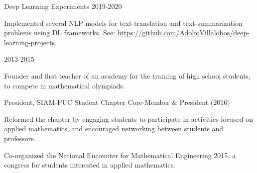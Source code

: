 
\begin{cventries}


  \cventry
  {Deep Learning Experiments}
  {}
  {}
  {2019-2020}{
  \begin{cvitems}
   \item {Implemented several NLP models for text-translation and text-summarization problems using DL frameworks. See: \url{https://github.com/AdolfoVillalobos/deep-learning-projects}.}
  \end{cvitems}
   }


\end{cventries}

\begin{cventries}
  {}
  {}
  {2013-2015}
  {\begin{cvitems}
    \item {Founder and first teacher of an academy for the training of high school students, to compete in mathematical olympiads.}
  \end{cvitems}
}
  \cventry
  {President, SIAM-PUC Student Chapter}
  {}
  {}
  {Core-Member \& President (2016)}
  {
    \begin{cvitems}
      \item {Reformed the chapter by engaging students to participate in activities focused 
        on applied mathematics, and encouraged networking between students and professors.}
      \item {Co-organized the National Encounter for Mathematical Engineering 2015, a congress for students interested in applied mathematics.}
    \end{cvitems}
    }
\end{cventries}

 

